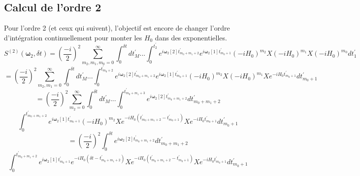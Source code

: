 
\subsection{Calcul de l'ordre 2}
Pour l'ordre 2 (et ceux qui suivent), l'objectif est encore de changer l'ordre d'intégration continuellement pour monter les $H_0$ dans des exponentielles.
\begin{equation*}
    S^{(2)}(\boldsymbol{\omega}_2, \delta t) = \left(\frac{-i}{2}\right)^2\sum_{m_2,m_1,m_0 = 0}^{\infty}\int_{0}^{\delta t}dt_M^{'}... \int_{0}^{t_2^{'}}e^{i\boldsymbol{\omega}_2[2]t^{'}_{m_0+m_1+2}}e^{i\boldsymbol{\omega}_2[1]t^{'}_{m_0+1}}(-iH_0)^{m_2}X(-iH_0)^{m_1}X(-iH_0)^{m_0} dt_1^{'}
\end{equation*}
\begin{equation*}
    = \left(\frac{-i}{2}\right)^2\sum_{m_2,m_1= 0}^{\infty}\int_{0}^{\delta t}dt_M^{'}... \int_{0}^{t_{m_0+2}^{'}}e^{i\boldsymbol{\omega}_2[2]t^{'}_{m_0+m_1+2}}e^{i\boldsymbol{\omega}_2[1]t^{'}_{m_0+1}}(-iH_0)^{m_2}X(-iH_0)^{m_1}Xe^{-iH_0t_{m_0+1}^{'}} dt_{m_0+1}^{'}
\end{equation*}
\begin{equation*}
    = \left(\frac{-i}{2}\right)^2\sum_{m_2= 0}^{\infty}\int_{0}^{\delta t}dt_M^{'}...\int_{0}^{t^{'}_{m_0+m_1+3}} e^{i\boldsymbol{\omega}_2[2]t^{'}_{m_0+m_1+2}} dt^{'}_{m_0+m_1+2} 
\end{equation*}
\begin{equation*}
    \int_{0}^{t^{'}_{m_0+m_1+2}}e^{i\boldsymbol{\omega}_2[1]t^{'}_{m_0+1}} (-iH_0)^{m_2}Xe^{-iH_0(t_{m_0+m_1+2}^{'} - t_{m_0+1}^{'})}Xe^{-iH_0t_{m_0+1}^{'}} dt^{'}_{m_0+1}
\end{equation*}
\begin{equation*}
    = \left(\frac{-i}{2}\right)^2 \int_{0}^{\delta t} e^{i\boldsymbol{\omega}_2[2]t^{'}_{m_0+m_1+2}}dt^{'}_{m_0+m_1+2}
\end{equation*}
\begin{equation*}
    \int_{0}^{t^{'}_{m_0+m_1+2}}e^{i\boldsymbol{\omega}_2[1]t^{'}_{m_0+1}} e^{-iH_0(\delta t - t_{m_0+m_1+2}^{'} )}Xe^{-iH_0(t_{m_0+m_1+2}^{'} - t_{m_0+1}^{'})}Xe^{-iH_0t_{m_0+1}^{'}} dt^{'}_{m_0+1}
\end{equation*}
